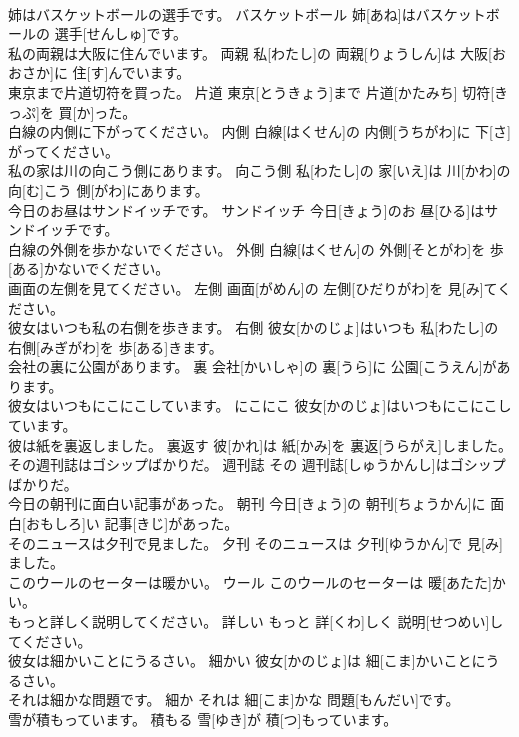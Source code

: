\documentclass[8pt]{extreport}
\begin{document}
\begin{CJK}{UTF8}{min}
\\	姉はバスケットボールの選手です。	バスケットボール	姉[あね]はバスケットボールの 選手[せんしゅ]です。	
\\	私の両親は大阪に住んでいます。	両親	私[わたし]の 両親[りょうしん]は 大阪[おおさか]に 住[す]んでいます。	
\\	東京まで片道切符を買った。	片道	東京[とうきょう]まで 片道[かたみち] 切符[きっぷ]を 買[か]った。	
\\	白線の内側に下がってください。	内側	白線[はくせん]の 内側[うちがわ]に 下[さ]がってください。	
\\	私の家は川の向こう側にあります。	向こう側	私[わたし]の 家[いえ]は 川[かわ]の 向[む]こう 側[がわ]にあります。	
\\	今日のお昼はサンドイッチです。	サンドイッチ	今日[きょう]のお 昼[ひる]はサンドイッチです。	
\\	白線の外側を歩かないでください。	外側	白線[はくせん]の 外側[そとがわ]を 歩[ある]かないでください。	
\\	画面の左側を見てください。	左側	画面[がめん]の 左側[ひだりがわ]を 見[み]てください。	
\\	彼女はいつも私の右側を歩きます。	右側	彼女[かのじょ]はいつも 私[わたし]の 右側[みぎがわ]を 歩[ある]きます。	
\\	会社の裏に公園があります。	裏	会社[かいしゃ]の 裏[うら]に 公園[こうえん]があります。	
\\	彼女はいつもにこにこしています。	にこにこ	彼女[かのじょ]はいつもにこにこしています。	
\\	彼は紙を裏返しました。	裏返す	彼[かれ]は 紙[かみ]を 裏返[うらがえ]しました。	
\\	その週刊誌はゴシップばかりだ。	週刊誌	その 週刊誌[しゅうかんし]はゴシップばかりだ。	
\\	今日の朝刊に面白い記事があった。	朝刊	今日[きょう]の 朝刊[ちょうかん]に 面白[おもしろ]い 記事[きじ]があった。	
\\	そのニュースは夕刊で見ました。	夕刊	そのニュースは 夕刊[ゆうかん]で 見[み]ました。	
\\	このウールのセーターは暖かい。	ウール	このウールのセーターは 暖[あたた]かい。	
\\	もっと詳しく説明してください。	詳しい	もっと 詳[くわ]しく 説明[せつめい]してください。	
\\	彼女は細かいことにうるさい。	細かい	彼女[かのじょ]は 細[こま]かいことにうるさい。	
\\	それは細かな問題です。	細か	それは 細[こま]かな 問題[もんだい]です。	
\\	雪が積もっています。	積もる	雪[ゆき]が 積[つ]もっています。	

\end{CJK}
\end{document}
